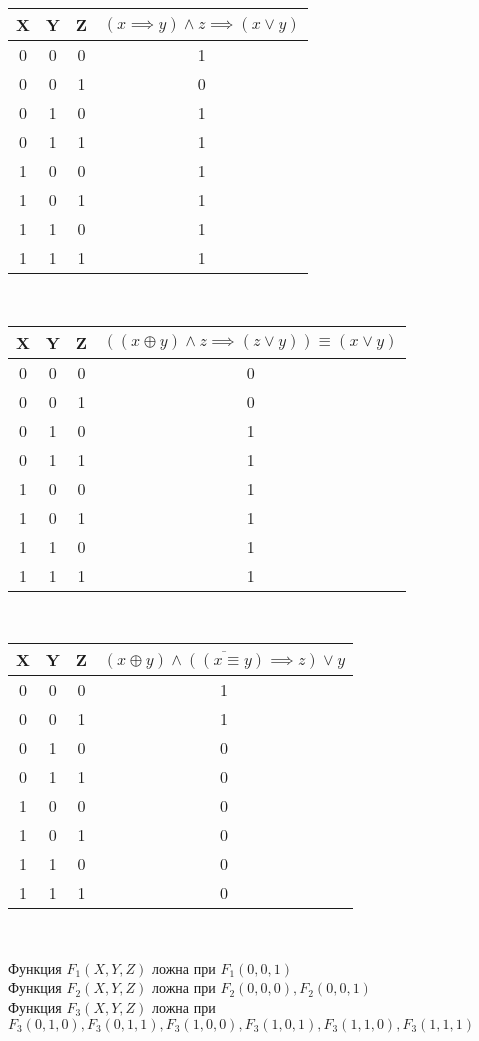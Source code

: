 \documentclass[a4paper,12pt]{report} %
\begin{document}
\begin{flushleft}
\begin{multicols}{2}
\begin{tabular}{ | c | c | c | c |}
\hline
X & Y & Z & $(x \implies y) \wedge z \implies (x \vee y)$ \\
\hline
0 & 0 & 0 & 1 \\
\hline
0 & 0 & 1 & 0 \\ 
\hline
0 & 1 & 0 & 1 \\
\hline
0 & 1 & 1 & 1 \\
\hline
1 & 0 & 0 & 1 \\
\hline
1 & 0 & 1 & 1 \\
\hline
1 & 1 & 0 & 1 \\
\hline
1 & 1 & 1 & 1 \\
\hline
\end{tabular} \\

\begin{tabular}{ | c | c | c | c |}
\hline
X & Y & Z & $((x \oplus y) \wedge z \implies (z \vee y)) \equiv (x \vee y)$ \\
\hline
0 & 0 & 0 & 0 \\
\hline
0 & 0 & 1 & 0 \\ 
\hline
0 & 1 & 0 & 1 \\
\hline
0 & 1 & 1 & 1 \\
\hline
1 & 0 & 0 & 1 \\
\hline
1 & 0 & 1 & 1 \\
\hline
1 & 1 & 0 & 1 \\
\hline
1 & 1 & 1 & 1 \\
\hline
\end{tabular} \\
\end{multicols}
\bigskip

\begin{center}
\begin{tabular}{ | c | c | c | c |}
\hline
X & Y & Z & $\overline{(x \oplus y) \wedge ((x \equiv y) \implies z) \vee y}$ \\
\hline
0 & 0 & 0 & 1 \\
\hline
0 & 0 & 1 & 1 \\ 
\hline
0 & 1 & 0 & 0 \\
\hline
0 & 1 & 1 & 0 \\
\hline
1 & 0 & 0 & 0 \\
\hline
1 & 0 & 1 & 0 \\
\hline
1 & 1 & 0 & 0 \\
\hline
1 & 1 & 1 & 0 \\
\hline
\end{tabular} \\
\end{center}

Функция $F_1(X,Y,Z)$ ложна при $F_1(0,0,1)$\\
Функция $F_2(X,Y,Z)$ ложна при $F_2(0,0,0), F_2(0,0,1)$\\
Функция $F_3(X,Y,Z)$ ложна при $F_3(0,1,0), F_3(0,1,1), F_3(1,0,0), F_3(1,0,1), F_3(1,1,0), F_3(1,1,1)$\\

\end{flushleft}
\end{document}

